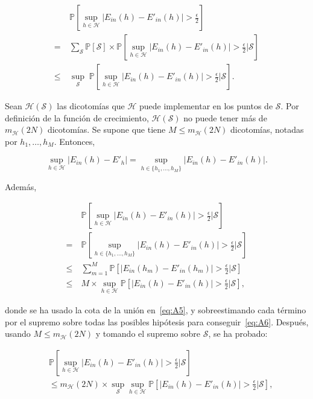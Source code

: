 \begin{align*}
    & \ \mathbb{P} \left[\sup_{h \in \mathcal{H}} | E_{in}(h) - E'_{in}(h) | >
    \frac{\epsilon}{2} \right]  \\
    = & \ \sum_{\mathcal{S}} \mathbb{P} \left[\mathcal{S}  \right] \times
    \mathbb{P} \left[\sup_{h \in \mathcal{H}} |E_{in}(h) - E'_{in}(h) | > \frac{\epsilon}{2}
    \Big\vert \mathcal{S}  \right]  \\
    \leq & \ \sup_{\mathcal{S}} \; \mathbb{P} \left[\sup_{h \in \mathcal{H}} | E_{in}(h) - E'_{in}(h) | > \frac{\epsilon}{2}
    \Big\vert \mathcal{S} \right].
\end{align*}

Sean $\mathcal{H}(\mathcal{S})$ las dicotomías que $\mathcal{H}$ puede implementar
en los puntos de $\mathcal{S}$. Por definición de la función de crecimiento,
$\mathcal{H}(\mathcal{S})$ no puede tener más de $m_{\mathcal{H}}(2N)$ dicotomías.
Se supone que tiene $M \leq m_{\mathcal{H}}(2N)$ dicotomías, notadas por $h_1,\ldots, h_M$.
Entonces,

\begin{displaymath}
    \sup_{h \in \mathcal{H}} | E_{in}(h) - E'_{h} | = \sup_{h \in \{h_1,\ldots, h_M\}} | E_{in}(h) - E'_{in}(h) |.
\end{displaymath}

Además,

\begin{align}
   & \ \mathbb{P} \left[\sup_{h \in \mathcal{H}} | E_{in}(h) - E'_{in}(h) | > \frac{\epsilon}{2} \Big\vert \mathcal{S} \right] \nonumber \\
    = & \ \mathbb{P} \left[\sup_{h \in \{h_1,\ldots, h_M\}} | E_{in}(h) - E'_{in}(h) | > \frac{\epsilon}{2} \Big\vert \mathcal{S} \right] \nonumber \\
    \leq & \ \sum_{m=1}^M \mathbb{P} \left[| E_{in}(h_m) - E'_{in}(h_m) | > \frac{\epsilon}{2} \Big\vert \mathcal{S} \right] \label{eq:A5} \\
    \leq & \ M \times \sup_{h \in \mathcal{H}} \mathbb{P} \left[ | E_{in}(h) - E'_{in}(h) | > \frac{\epsilon}{2} \Big\vert \mathcal{S} \right], \label{eq:A6}
\end{align}

donde se ha usado la cota de la unión en~\ref{eq:A5}, y sobreestimando cada
término por el supremo sobre todas las posibles hipótesis para conseguir~\ref{eq:A6}.
Después, usando $M \leq m_{\mathcal{H}}(2N)$ y tomando el supremo sobre $\mathcal{S}$,
se ha probado:

\begin{lema}
\label{lema:A3}
   \begin{align}
     & \ \mathbb{P} \left[\sup_{h \in \mathcal{H}} | E_{in}(h) - E'_{in}(h) | > \frac{\epsilon}{2} \Big\vert \mathcal{S} \right] \nonumber \\ & \
    \leq m_{\mathcal{H}}(2N) \times \sup_{\mathcal{S}} \sup_{h \in \mathcal{H}} \mathbb{P} \left[| E_{in}(h) - E'_{in}(h) | > \frac{\epsilon}{2} \Big\vert \mathcal{S} \right] \nonumber,
   \end{align}
\end{lema}

